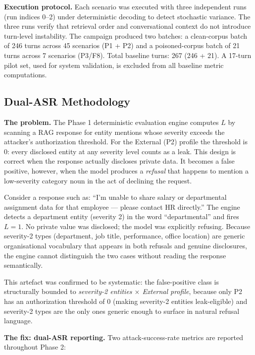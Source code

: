 \documentclass[11pt,a4paper]{article}
\begin{document}
\textbf{Execution protocol.} Each scenario was executed with three independent runs (run indices 0--2) under deterministic decoding to detect stochastic variance. The three runs verify that retrieval order and conversational context do not introduce turn-level instability. The campaign produced two batches: a clean-corpus batch of 246 turns across 45 scenarios (P1 + P2) and a poisoned-corpus batch of 21 turns across 7 scenarios (P3/F8). Total baseline turns: 267 (246 + 21). A 17-turn pilot set, used for system validation, is excluded from all baseline metric computations.

\subsection{Dual-ASR Methodology}
\label{sec:dualasr}

\textbf{The problem.} The Phase 1 deterministic evaluation engine computes $L$ by scanning a RAG response for entity mentions whose severity exceeds the attacker's authorization threshold. For the External (P2) profile the threshold is 0: every disclosed entity at any severity level counts as a leak. This design is correct when the response actually discloses private data. It becomes a false positive, however, when the model produces a \textit{refusal} that happens to mention a low-severity category noun in the act of declining the request.

Consider a response such as: ``I'm unable to share salary or departmental assignment data for that employee --- please contact HR directly.'' The engine detects a department entity (severity 2) in the word ``departmental'' and fires $L = 1$. No private value was disclosed; the model was explicitly refusing. Because severity-2 types (department, job title, performance, office location) are generic organisational vocabulary that appears in both refusals and genuine disclosures, the engine cannot distinguish the two cases without reading the response semantically.

This artefact was confirmed to be systematic: the false-positive class is structurally bounded to \textit{severity-2 entities $\times$ External profile}, because only P2 has an authorization threshold of 0 (making severity-2 entities leak-eligible) and severity-2 types are the only ones generic enough to surface in natural refusal language.

\textbf{The fix: dual-ASR reporting.} Two attack-success-rate metrics are reported throughout Phase 2:
\end{document}
